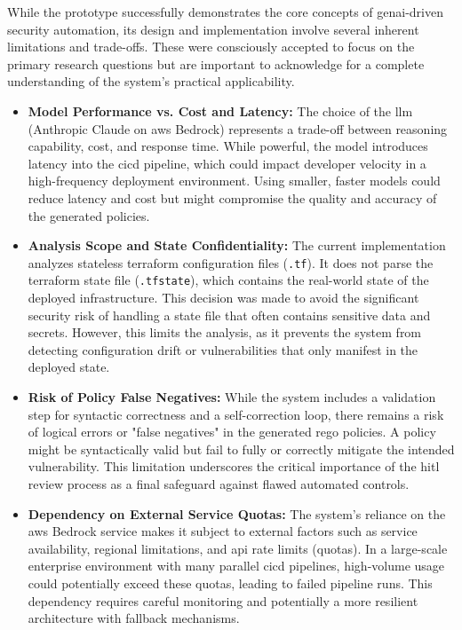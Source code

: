 While the prototype successfully demonstrates the core concepts of \gls{genai}-driven security automation, its design and implementation involve several inherent limitations and trade-offs. These were consciously accepted to focus on the primary research questions but are important to acknowledge for a complete understanding of the system's practical applicability.

\begin{itemize}
    \item \textbf{Model Performance vs. Cost and Latency:} The choice of the \gls{llm} (Anthropic Claude on \gls{aws} Bedrock) represents a trade-off between reasoning capability, cost, and response time. While powerful, the model introduces latency into the \gls{cicd} pipeline, which could impact developer velocity in a high-frequency deployment environment. Using smaller, faster models could reduce latency and cost but might compromise the quality and accuracy of the generated policies.
    
    \item \textbf{Analysis Scope and State Confidentiality:} The current implementation analyzes stateless \gls{terraform} configuration files (\texttt{.tf}). It does not parse the \gls{terraform} state file (\texttt{.tfstate}), which contains the real-world state of the deployed infrastructure. This decision was made to avoid the significant security risk of handling a state file that often contains sensitive data and secrets. However, this limits the analysis, as it prevents the system from detecting configuration drift or vulnerabilities that only manifest in the deployed state.

    \item \textbf{Risk of Policy False Negatives:} While the system includes a validation step for syntactic correctness and a self-correction loop, there remains a risk of logical errors or "false negatives" in the generated \gls{rego} policies. A policy might be syntactically valid but fail to fully or correctly mitigate the intended vulnerability. This limitation underscores the critical importance of the \gls{hitl} review process as a final safeguard against flawed automated controls.

    \item \textbf{Dependency on External Service Quotas:} The system's reliance on the \gls{aws} Bedrock service makes it subject to external factors such as service availability, regional limitations, and \gls{api} rate limits (quotas). In a large-scale enterprise environment with many parallel \gls{cicd} pipelines, high-volume usage could potentially exceed these quotas, leading to failed pipeline runs. This dependency requires careful monitoring and potentially a more resilient architecture with fallback mechanisms.
    

\end{itemize}
